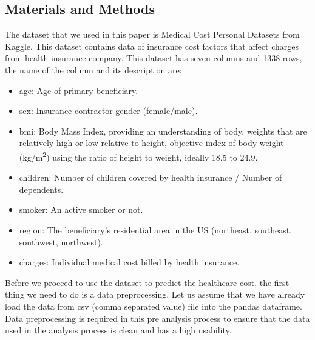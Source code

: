 \documentclass[a4paper, 12pt]{article}
\begin{document}
\begin{multicols}{2}
\section{Materials and Methods}
The dataset that we used in this paper is Medical Cost Personal Datasets from Kaggle. This dataset contains data of insurance cost factors that affect charges from health insurance company. This dataset has seven columns and 1338 rows, the name of the column and its description are:
  \begin{itemize}
    \item age: Age of primary beneficiary.
    \item sex: Insurance contractor gender (female/male).
    \item bmi: Body Mass Index, providing an understanding of body, weights that are relatively high or low relative to height, objective index of body weight (kg/m\textsuperscript{2}) using the ratio of height to weight, ideally 18.5 to 24.9. 
    \item children: Number of children covered by health insurance / Number of dependents.
    \item smoker: An active smoker or not.
    \item region: The beneficiary's residential area in the US (northeast, southeast, southwest, northwest).
    \item charges: Individual medical cost billed by health insurance.
  \end{itemize}

  Before we proceed to use the dataset to predict the healthcare cost, the first thing we need to do is a data preprocessing. Let us assume that we have already load the data from csv (comma separated value) file into the pandas dataframe. Data preprocessing is required in this pre analysis process to ensure that the data used in the analysis process is clean and has a high usability.  


\end{multicols}
\end{document}
